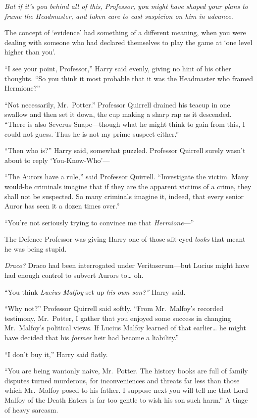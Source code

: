 \emph{But if it's you behind all of this, Professor, you might have
shaped your plans to frame the Headmaster, and taken care to cast
suspicion on him in advance.}

The concept of `evidence' had something of a different meaning, when you
were dealing with someone who had declared themselves to play the game
at `one level higher than you'.

``I see your point, Professor,'' Harry said evenly, giving no hint of
his other thoughts. ``So you think it most probable that it was the
Headmaster who framed Hermione?''

``Not necessarily, Mr.~Potter.'' Professor Quirrell drained his teacup
in one swallow and then set it down, the cup making a sharp rap as it
descended. ``There is also Severus Snape---though what he might think to
gain from this, I could not guess. Thus he is not my prime suspect
either.''

``Then who is?'' Harry said, somewhat puzzled. Professor Quirrell surely
wasn't about to reply `You-Know-Who'---

``The Aurors have a rule,'' said Professor Quirrell. ``Investigate the
victim. Many would-be criminals imagine that if they are the apparent
victims of a crime, they shall not be suspected. So many criminals
imagine it, indeed, that every senior Auror has seen it a dozen times
over.''

``You're not seriously trying to convince me that \emph{Hermione}---''

The Defence Professor was giving Harry one of those slit-eyed
\emph{looks} that meant he was being stupid.

\emph{Draco?} Draco had been interrogated under Veritaserum---but Lucius
might have had enough control to subvert Aurors to\ldots{} oh.

``You think \emph{Lucius Malfoy} set up \emph{his own son?''} Harry
said.

``Why not?'' Professor Quirrell said softly. ``From Mr.~Malfoy's
recorded testimony, Mr.~Potter, I gather that you enjoyed some success
in changing Mr.~Malfoy's political views. If Lucius Malfoy learned of
that earlier\ldots{} he might have decided that his \emph{former} heir
had become a liability.''

``I don't buy it,'' Harry said flatly.

``You are being wantonly naive, Mr.~Potter. The history books are full
of family disputes turned murderous, for inconveniences and threats far
less than those which Mr.~Malfoy posed to his father. I suppose next you
will tell me that Lord Malfoy of the Death Eaters is far too gentle to
wish his son such harm.'' A tinge of heavy sarcasm.

